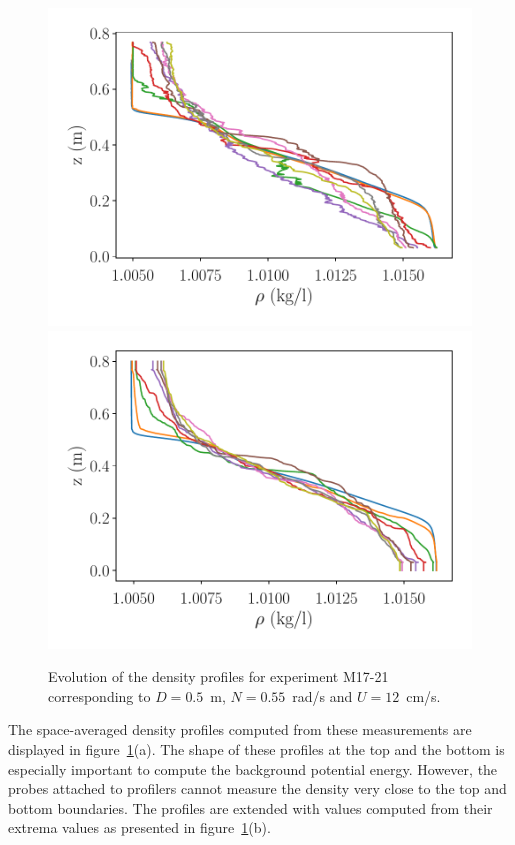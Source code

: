 \begin{figure}[htp!]
\centering
\includegraphics[width=0.7\figwidth]{tmp/fig_profiles_mixing}
\includegraphics[width=0.7\figwidth]{tmp/fig_profiles_probe_averaged}

\caption{Evolution of the density profiles for experiment M17-21 corresponding
to $D = 0.5$~m, $N=0.55$~rad/s and $U=12$~cm/s.}%
\label{fig:profiles:mixing}

\end{figure}

The space-averaged density profiles computed from these measurements are
displayed in figure~\ref{fig:profiles:mixing}(a). The shape of these profiles
at the top and the bottom is especially important to compute the background
potential energy. However, the probes attached to profilers cannot measure the
density very close to the top and bottom boundaries. The profiles are extended
with values computed from their extrema values as presented in
figure~\ref{fig:profiles:mixing}(b).

